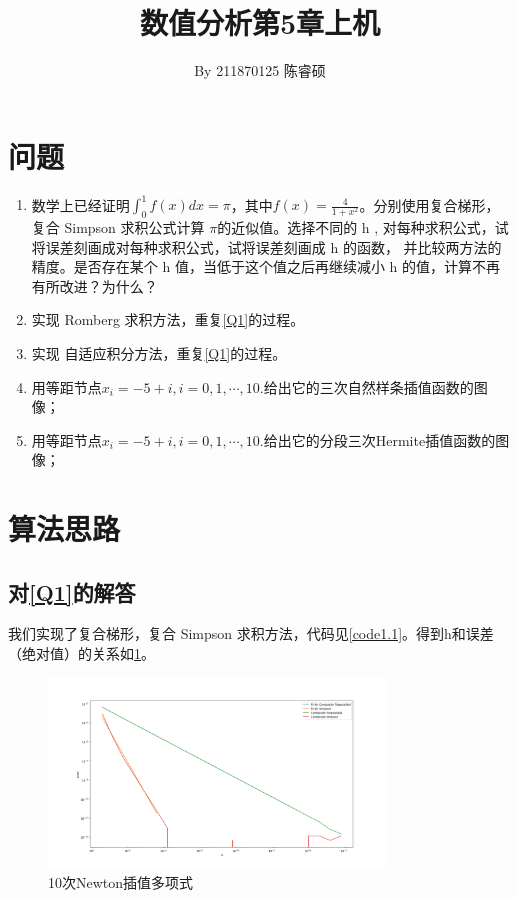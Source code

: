 \documentclass[a4paper,11pt,notitlepage]{article}
\title{\vspace{-1.5cm} \textbf{\huge{数值分析第5章上机}}\vspace{-1em}}
\author{By 211870125 陈睿硕}
\date{}
\begin{document}
\maketitle
\vspace{-1cm}
\thispagestyle{fancy}

\section{问题}
\begin{adjustwidth}{1em}{0pt}
\begin{enumerate}[label=\textbf{Q\arabic*}]
    \item 数学上已经证明$\int^{1}_{0}f(x)dx=\pi$，其中$f(x)=\frac{4}{1+x^2}$。分别使用复合梯形，复合 Simpson 求积公式计算
          $\pi$的近似值。选择不同的 h , 对每种求积公式，试将误差刻画成对每种求积公式，试将误差刻画成 h 的函数，
          并比较两方法的精度。是否存在某个 h 值，当低于这个值之后再继续减小 h 的值，计算不再有所改进？为什么？\label{Q1}\notag
    \item 实现 Romberg 求积方法，重复\ref{Q1}的过程。\label{Q2}\notag
    \item 实现 自适应积分方法，重复\ref{Q1}的过程。\label{Q3}\notag
    \item 用等距节点$x_{i}=-5+i,i=0,1,\cdots,10.$给出它的三次自然样条插值函数的图像；\label{Q4}\notag
    \item 用等距节点$x_{i}=-5+i,i=0,1,\cdots,10.$给出它的分段三次Hermite插值函数的图像；\label{Q5}\notag
\end{enumerate}
\end{adjustwidth}

\section{算法思路}
\subsection{对\ref{Q1}的解答}
我们实现了复合梯形，复合 Simpson 求积方法，代码见\cref{code1.1}。得到h和误差（绝对值）的关系如\cref{pic:1}。
\begin{figure}[H]
    \centering
    \includegraphics[width=0.8\textwidth]{../picture/Fifth_Chapter_1A.png}
    \caption{10次Newton插值多项式}
    \label{pic:1}
\end{figure}
\end{document}
